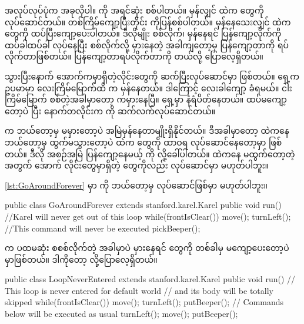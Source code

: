 \begin{sloppypar}
\enWhileLoop အလုပ်လုပ်ပုံက အခုလိုပါ။  \mmCondition ကို အရင်ဆုံး စစ်ပါတယ်။ မှန်လျှင် \mmBody ထဲက \mmcommand တွေကို လုပ်ဆောင်တယ်။ တစ်ကြိမ်ကျော့ပြီးတိုင်း \mmCondition ကိုပြန်စစ်ပါတယ်။ မှန်နေသေးလျှင် \mmBody ထဲက \mmcommand တွေကို ထပ်ပြီးကျော့ပေးပါတယ်။ ဒီလိုမျိုး \mmCondition စစ်လိုက်၊ မှန်နေရင် ပြန်ကျော့လိုက်ကို ထပ်ခါထပ်ခါ လုပ်နေပြီး \mmCondition စစ်လိုက်လို့ မှားနေတဲ့ အခါကျတော့မှ ပြန်ကျော့တာကို ရပ်လိုက်တာဖြစ်တယ်။ ပြန်ကျော့တာရပ်လိုက်တာကို \enLoopExits တယ်လို့ ပြောလေ့ရှိတယ်။

\mmLoopExits သွားပြီးနောက် \mmLoopBody ‌အောက်ကမှာရှိတဲ့လိုင်းတွေကို ဆက်ပြီးလုပ်ဆောင်မှာ ဖြစ်တယ်။ ရှေ့ကဥပမာမှာ လေးကြိမ်မြောက်ထိ  \mmCondition က မှန်နေတယ်။ ဒါကြောင့် လေးခါကျော့ ခံရမယ်။ ငါးကြိမ်မြောက် \mmCondition စစ်တဲ့အခါမှာတော့  ကမှားနေပြီ။ ရှေ့မှာ နံရံပိတ်နေတယ်။ ထပ်မကျော့တော့ပဲ \mmLoopExits ပြီး နောက်တလိုင်းက  ကို ဆက်လက်လုပ်ဆောင်တယ်။

\enWhileLoop \mmCondition က ဘယ်တော့မှ မမှားတော့ပဲ အမြဲမှန်နေတာမျိုးရှိနိုင်တယ်။ ဒီအခါမှာတော့ \enLoop ထဲကနေ ဘယ်တော့မှ ထွက်မသွားတော့ပဲ \mmBody ထဲက \mmcommand တွေကို ထာဝရ လုပ်ဆောင်နေတော့မှာ ဖြစ်တယ်။ ဒီလို အစဉ်အမြဲ ပြန်ကျော့နေမယ့် \mmLoop ကို \mmInfiniteLoop လို့ခေါ်ပါတယ်။ \enInfiniteLoop ထဲကနေ မထွက်တော့တဲ့ အတွက် \mmLoopBody အောက် လိုင်းတွေမှာရှိတဲ့ \mmcommand တွေကိုလည်း လုပ်ဆောင်မှာ မဟုတ်ပါဘူး။ 

\noindent \Lst \vref*{lst:GoAroundForever} မှာ  ကို ဘယ်တော့မှ လုပ်ဆောင်ဖြစ်မှာ မဟုတ်ပါဘူး။

\begin{lstcodesimple}[float, caption={\mycodelstcpt{GoAroundForever.java} \myenlstcpt{A}}, label={lst:GoAroundForever}]
public class GoAroundForever extends stanford.karel.Karel{
    public void run(){
            //Karel will never get out of this loop
            while(frontIsClear()) {
                    move();
                    turnLeft();
            }
            //This command will never be executed
            pickBeeper();
    }
}
\end{lstcodesimple}

\enWhileLoop \enCondition က ပထမဆုံး စစစ်လိုက်တဲ့ အခါမှာပဲ မှားနေရင် \mmcommand တွေကို တစ်ခါမှ မကျော့ပေးတော့ပဲ \mmLoopExits မှာဖြစ်တယ်။ ဒါကိုတော့ \enLoopNeverEntered လို့ပြောလေ့ရှိတယ်။

\begin{lstcodesimple}[float, caption={\mycodelstcpt{LoopNeverEntered.java} \myenlstcpt{A}}, label={lst:LoopNeverEntered}]
public class LoopNeverEntered extends stanford.karel.Karel{
    public void run(){
            // This loop is never entered for default world
            // and its body will be totally skipped
            while(frontIsClear()) {
                    move();
                    turnLeft();
                    putBeeper();
            }
            // Commands below will be executed as usual
            turnLeft();
            move();
            putBeeper();
    }
}
\end{lstcodesimple}


\end{sloppypar}

